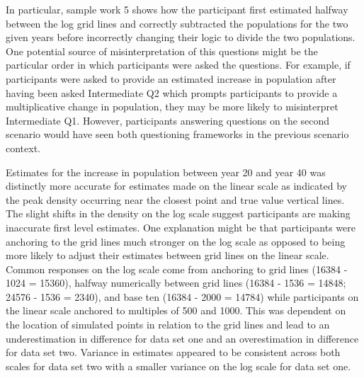 \documentclass[print]{nuthesis}
\begin{document}
In particular, sample work 5 shows how the participant first estimated halfway between the log grid lines and correctly subtracted the populations for the two given years before incorrectly changing their logic to divide the two populations.
One potential source of misinterpretation of this questions might be the particular order in which participants were asked the questions.
For example, if participants were asked to provide an estimated increase in population after having been asked Intermediate Q2 which prompts participants to provide a multiplicative change in population, they may be more likely to misinterpret Intermediate Q1.
However, participants answering questions on the second scenario would have seen both questioning frameworks in the previous scenario context.

Estimates for the increase in population between year 20 and year 40 was distinctly more accurate for estimates made on the linear scale as indicated by the peak density occurring near the closest point and true value vertical lines.
The slight shifts in the density on the log scale suggest participants are making inaccurate first level estimates.
One explanation might be that participants were anchoring to the grid lines much stronger on the log scale as opposed to being more likely to adjust their estimates between grid lines on the linear scale.
Common responses  on the log scale come from anchoring to grid lines (16384 - 1024 = 15360), halfway numerically between grid lines (16384 - 1536 = 14848; 24576 - 1536 = 2340), and base ten (16384 - 2000 = 14784) while participants on the linear scale anchored to multiples of 500 and 1000.
This was dependent on the location of simulated points in relation to the grid lines and lead to an underestimation in difference for data set one and an overestimation in difference for data set two.
Variance in estimates appeared to be consistent across both scales for data set two with a smaller variance on the log scale for data set one.
\end{document}
